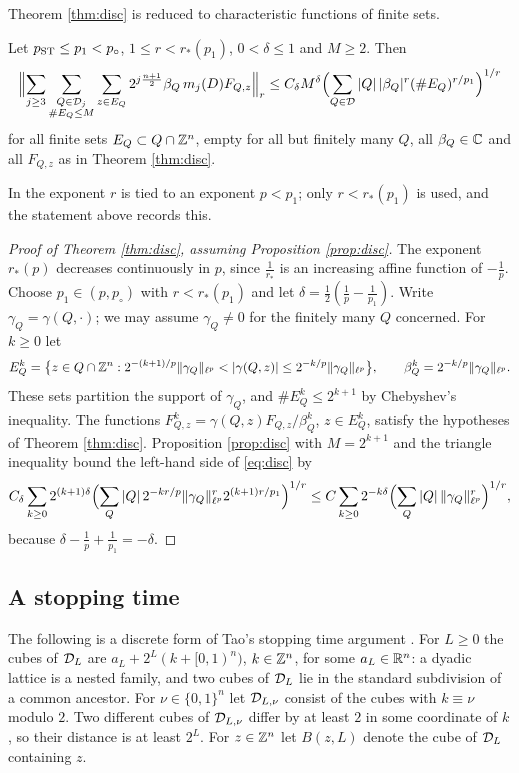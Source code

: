 Theorem \ref{thm:disc} is reduced to characteristic functions of finite sets.

\begin{proposition}\label{prop:disc}
Let $p_{\rm ST}\le p_1<p_\circ$, $1\le r<r_*(p_1)$, $0<\delta\le1$ and $M\ge2$. Then
\begin{equation}\label{eq:propdisc}
\Bigl\|\sum_{j\ge3}\sum_{\substack{Q\in\mathcal D_j\\ \#E_Q\le M}}\sum_{z\in E_Q}2^{j\frac{n+1}2}\beta_Q\,m_j(D)F_{Q,z}\Bigr\|_r
\le C_\delta M^\delta\Bigl(\sum_{Q\in\mathcal D}|Q|\,|\beta_Q|^r(\#E_Q)^{r/p_1}\Bigr)^{1/r}
\end{equation}
for all finite sets $E_Q\subset Q\cap\mathbb{Z}^n$, empty for all but finitely many $Q$, all $\beta_Q\in\mathbb{C}$ and all
$F_{Q,z}$ as in Theorem \ref{thm:disc}.
\end{proposition}

In \cite{BRS23} the exponent $r$ is tied to an exponent $p<p_1$; only $r<r_*(p_1)$ is used, and the
statement above records this.

\begin{proof}[Proof of Theorem \ref{thm:disc}, assuming Proposition \ref{prop:disc}]
The exponent $r_*(p)$ decreases continuously in $p$, since $\frac1{r_*}$ is an increasing affine function of
$-\frac1p$. Choose $p_1\in(p,p_\circ)$ with $r<r_*(p_1)$ and let $\delta=\frac12(\frac1p-\frac1{p_1})$. Write
$\gamma_Q=\gamma(Q,\cdot)$; we may assume $\gamma_Q\ne0$ for the finitely many $Q$ concerned. For $k\ge0$ let
\[
E^k_Q=\bigl\{z\in Q\cap\Z^n:2^{-(k+1)/p}\|\gamma_Q\|_{\ell^p}<|\gamma(Q,z)|\le2^{-k/p}\|\gamma_Q\|_{\ell^p}\bigr\},
\qquad\beta^k_Q=2^{-k/p}\|\gamma_Q\|_{\ell^p} .
\]
These sets partition the support of $\gamma_Q$, and $\#E^k_Q\le2^{k+1}$ by Chebyshev's inequality. The
functions $F^k_{Q,z}=\gamma(Q,z)F_{Q,z}/\beta^k_Q$, $z\in E^k_Q$, satisfy the hypotheses of Theorem
\ref{thm:disc}. Proposition \ref{prop:disc} with $M=2^{k+1}$ and the triangle inequality bound the
left-hand side of \eqref{eq:disc} by
\[
C_\delta\sum_{k\ge0}2^{(k+1)\delta}\Bigl(\sum_Q|Q|\,2^{-kr/p}\|\gamma_Q\|_{\ell^p}^r2^{(k+1)r/p_1}\Bigr)^{1/r}
\le C\sum_{k\ge0}2^{-k\delta}\Bigl(\sum_Q|Q|\,\|\gamma_Q\|_{\ell^p}^r\Bigr)^{1/r},
\]
because $\delta-\frac1p+\frac1{p_1}=-\delta$.
\end{proof}

\subsection{A stopping time}\label{ssec:stopping}
The following is a discrete form of Tao's stopping time argument \cite[Lemma 4.3]{Tao98}. For $L\ge0$ the
cubes of $\mathcal D_L$ are $a_L+2^L(k+[0,1)^n)$, $k\in\mathbb{Z}^n$, for some $a_L\in\mathbb{R}^n$: a dyadic lattice is a nested
family, and two cubes of $\mathcal D_L$ lie in the standard subdivision of a common ancestor. For
$\nu\in\{0,1\}^n$ let $\mathcal D_{L,\nu}$ consist of the cubes with $k\equiv\nu$ modulo $2$. Two different cubes of
$\mathcal D_{L,\nu}$ differ by at least $2$ in some coordinate of $k$, so their distance is at least $2^L$. For
$z\in\mathbb{Z}^n$ let $B(z,L)$ denote the cube of $\mathcal D_L$ containing $z$.

